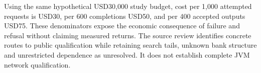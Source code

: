 Using the same hypothetical USD30,000 study budget, cost per 1,000 attempted requests is USD30, per 600 completions USD50, and per 400 accepted outputs USD75. These denominators expose the economic consequence of failure and refusal without claiming measured returns. The source review identifies concrete routes to public qualification while retaining search tails, unknown bank structure and unrestricted dependence as unresolved. It does not establish complete JVM network qualification.\citep{exec25_jnet_choice}
